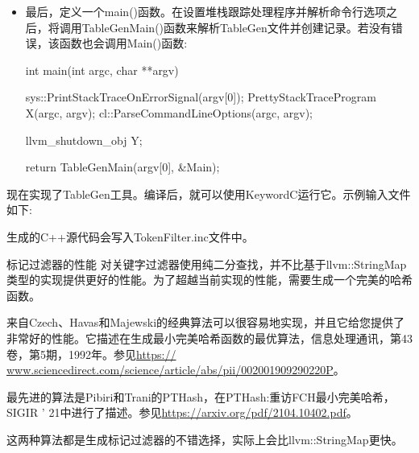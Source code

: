 \begin{itemize}
\item
最后，定义一个main()函数。在设置堆栈跟踪处理程序并解析命令行选项之后，将调用TableGenMain()函数来解析TableGen文件并创建记录。若没有错误，该函数也会调用Main()函数:

\begin{cpp}
int main(int argc, char **argv) {
    sys::PrintStackTraceOnErrorSignal(argv[0]);
    PrettyStackTraceProgram X(argc, argv);
    cl::ParseCommandLineOptions(argc, argv);

    llvm_shutdown_obj Y;

    return TableGenMain(argv[0], &Main);
}
\end{cpp}

\end{itemize}

现在实现了TableGen工具。编译后，就可以使用KeywordC运行它。示例输入文件如下:


生成的C++源代码会写入TokenFilter.inc文件中。

\begin{myTip}{标记过滤器的性能}
对关键字过滤器使用纯二分查找，并不比基于llvm::StringMap类型的实现提供更好的性能。为了超越当前实现的性能，需要生成一个完美的哈希函数。

来自Czech、Havas和Majewski的经典算法可以很容易地实现，并且它给您提供了非常好的性能。它描述在生成最小完美哈希函数的最优算法，信息处理通讯，第43卷，第5期，1992年。参见\url{https:// www.sciencedirect.com/science/article/abs/pii/002001909290220P}。

最先进的算法是Pibiri和Trani的PTHash，在PTHash:重访FCH最小完美哈希，SIGIR ' 21中进行了描述。参见\url{https://arxiv.org/pdf/2104.10402.pdf}。

这两种算法都是生成标记过滤器的不错选择，实际上会比llvm::StringMap更快。
\end{myTip}




















